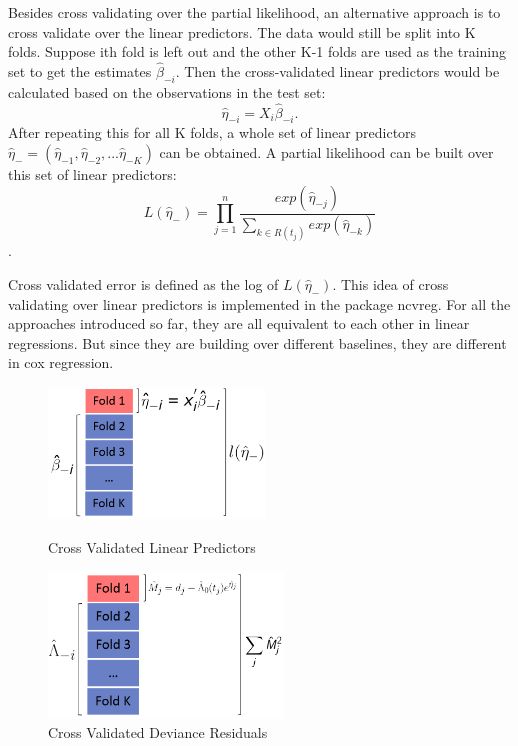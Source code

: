 \documentclass{article}\usepackage[]{graphicx}\usepackage[]{color}
\begin{document}
Besides cross validating over the partial likelihood, an alternative approach is to cross validate over the linear predictors. The data would still be split into K folds. Suppose ith fold is left out and the other K-1 folds are used as the training set to get the estimates $\hat{\beta}_{-i}$. Then the cross-validated linear predictors would be calculated based on the observations in the test set:  \begin{equation}\hat{\eta}_{-i} = X_{i}\hat{\beta}_{-i}.\end{equation} After repeating this for all K folds, a whole set of linear predictors  $\hat{\eta}_{-} = ( \hat{\eta}_{-1},  \hat{\eta}_{-2} , ...  \hat{\eta}_{-K})$ can be obtained. A partial likelihood can be built over this set of linear predictors: \begin{equation} L(\hat{\eta}_{-}) = \prod_{j=1}^{n} \frac{exp (\hat{\eta}_{-j})}{\sum_{ k \in R(t_{j})}exp (\hat{\eta}_{-k})}\end{equation}.

Cross validated error is defined as the log of $L(\hat{\eta}_{-})$. This idea of cross validating over linear predictors is implemented in the package ncvreg. For all the approaches introduced so far, they are all equivalent to each other in linear regressions. But since they are building over different baselines, they are different in cox regression.

   \begin{figure}[h]
    \centering
    \begin{minipage}[b]{0.5\textwidth}
      \centering
		  \includegraphics[height= 3.5cm ]{./figures/03.png}
      \caption{Cross Validated Linear Predictors}
     \end{minipage}
     \begin{minipage}[b]{0.5\textwidth}
      \centering
		  \includegraphics[height= 3.9cm ]{./figures/04.png}
      \caption{Cross Validated Deviance Residuals}
      \end{minipage}	
   \end{figure}	
    
\end{document}
